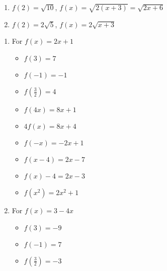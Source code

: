 \documentclass{ximera}
\begin{document}
\begin{multicols}{2}
\begin{enumerate}
\setcounter{enumi}{\value{HW}}

\item $f(2) = \sqrt{10}$, $f(x) = \sqrt{2(x+3)} = \sqrt{2x+6}$

\item $f(2) = 2 \sqrt{5}$, $f(x) = 2\sqrt{x+3}$ 

\setcounter{HW}{\value{enumi}}
\end{enumerate}
\end{multicols}

\begin{enumerate}
\setcounter{enumi}{\value{HW}}

\item For $f(x) = 2x+1$ 

\begin{multicols}{3}
\begin{itemize}
\item $f(3) = 7$
\item $f(-1) = -1$
\item $f\left(\frac{3}{2} \right) = 4$
\end{itemize}
\end{multicols}

\begin{multicols}{3}
\begin{itemize}
\item  $f(4x) = 8x+1$
\item $4f(x) = 8x+4$
\item $f(-x) = -2x+1$
\end{itemize}
\end{multicols}

\begin{multicols}{3}
\begin{itemize}
\item  $f(x-4) = 2x-7$
\item $f(x) - 4 = 2x-3$
\item  $f\left(x^2\right) = 2x^2+1$
\end{itemize}
\end{multicols}

\item For $f(x) = 3-4x$ 

\begin{multicols}{3}
\begin{itemize}
\item $f(3) = -9$
\item $f(-1) = 7$
\item $f\left(\frac{3}{2} \right) = -3$
\end{itemize}
\end{multicols}


\end{enumerate}
\end{document}
